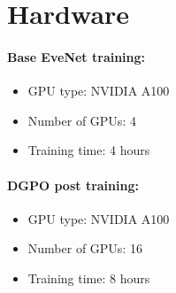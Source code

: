 \documentclass[10pt]{article}
\begin{document}
\section{Hardware}

\paragraph{Base EveNet training:}
\begin{itemize}
    \item[-] GPU type: NVIDIA A100
    \item[-] Number of GPUs: 4
    \item[-] Training time: 4 hours
\end{itemize}

\vspace{0.5em}

\paragraph{DGPO post training:}
\begin{itemize}
    \item[-] GPU type: NVIDIA A100
    \item[-] Number of GPUs: 16
    \item[-] Training time: 8 hours
\end{itemize}



\end{document}
